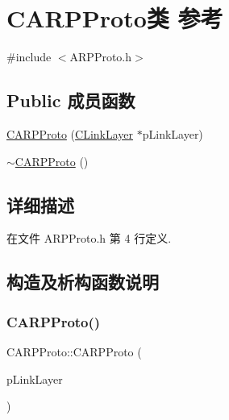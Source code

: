 \hypertarget{class_c_a_r_p_proto}{}\section{C\+A\+R\+P\+Proto类 参考}
\label{class_c_a_r_p_proto}


{\ttfamily \#include $<$A\+R\+P\+Proto.\+h$>$}

\subsection*{Public 成员函数}
\begin{DoxyCompactItemize}
\item 
\hyperlink{class_c_a_r_p_proto_a4b69b4679fa1592faee457425921bbf4}{C\+A\+R\+P\+Proto} (\hyperlink{class_c_link_layer}{C\+Link\+Layer} $\ast$p\+Link\+Layer)
\item 
\hyperlink{class_c_a_r_p_proto_afe219000052d79aa6b7ee0b2866bc703}{$\sim$\+C\+A\+R\+P\+Proto} ()
\end{DoxyCompactItemize}


\subsection{详细描述}


在文件 A\+R\+P\+Proto.\+h 第 4 行定义.



\subsection{构造及析构函数说明}
\mbox{\label{class_c_a_r_p_proto_a4b69b4679fa1592faee457425921bbf4}} 
\subsubsection{\texorpdfstring{C\+A\+R\+P\+Proto()}{CARPProto()}}
{\footnotesize\ttfamily C\+A\+R\+P\+Proto\+::\+C\+A\+R\+P\+Proto (\begin{DoxyParamCaption}\item[{\hyperlink{class_c_link_layer}{C\+Link\+Layer} $\ast$}]{p\+Link\+Layer }\end{DoxyParamCaption})}




